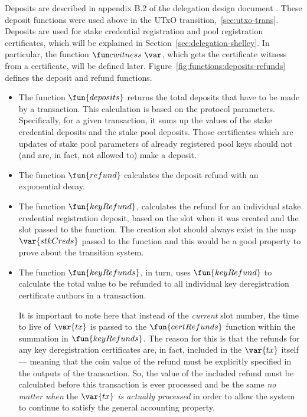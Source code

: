 Deposits are described in appendix B.2 of the delegation design document
\cite{delegation_design}.  These deposit functions were used above in the UTxO
transition,~\ref{sec:utxo-trans}. Deposits are used for stake credential
registration and pool registration certificates, which will be explained in
Section~\ref{sec:delegation-shelley}.  In particular, the function
$\cwitness{}$, which gets the certificate witness from a certificate, will be
defined later.  Figure~\ref{fig:functions:deposits-refunds} defines the deposit
and refund functions.
\begin{itemize}
\item The function $\fun{deposits}$ returns the total deposits that have to be
  made by a transaction.  This calculation is based on the protocol parameters.
  Specifically, for a given transaction, it sums up the values of the stake
  credential deposits and the stake pool deposits. Those certificates which are
  updates of stake pool parameters of already registered pool keys should not
  (and are, in fact, not allowed to) make a deposit.
  \item The function $\fun{refund}$ calculates the deposit refund with an exponential decay.
  \item The function $\fun{keyRefund}$, calculates the refund for an individual
    stake credential registration deposit, based on the slot when it was created
    and the slot passed to the function. The creation slot should always exist
    in the map $\var{stkCreds}$ passed to the function and this would be a good
    property to prove about the transition system.
  \item The function $\fun{keyRefunds}$, in turn, uses $\fun{keyRefund}$ to calculate
    the total value to be refunded to all individual key deregistration certificate authors
    in a transaction.

    It is important to note here that instead of the \textit{current} slot number,
    the time to live of $\var{tx}$ is passed to the $\fun{certRefunds}$ function
    within the summation in $\fun{keyRefunds}$. The reason for this is that the
    refunds for any key deregistration certificates are, in fact, included in
    the $\var{tx}$ itself --- meaning that the coin value of the refund must be
    explicitly specified in the outputs of the transaction. So,
    the value of the included refund must be calculated before this transaction
    is ever processed and be the same \textit{no matter when} the $\var{tx}$
    \textit{is actually processed} in order to allow the system to continue to
    satisfy the general accounting property.


\end{itemize}
